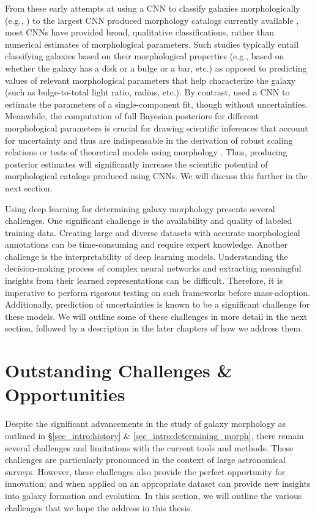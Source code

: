 From these early attempts at using a CNN to classify galaxies morphologically (e.g.,  \citealp{Dieleman2015Rotation-invariantPrediction}) to the largest CNN produced morphology catalogs currently available \citep{Cheng2021GalaxyNetworks, Vega-Ferrero2021PushingSurvey}, most CNNs have provided broad, qualitative classifications, rather than numerical estimates of morphological parameters. Such studies typically entail classifying galaxies based on their morphological properties (e.g., based on whether the galaxy has a disk or a bulge or a bar, etc.) as opposed to predicting values of relevant morphological parameters that help characterize the galaxy (such as bulge-to-total light ratio, radius, etc.). By contrast, \citet{Tuccillo2018DeepFitting} used a CNN to estimate the parameters of a single-component \sersic{} fit, though  without uncertainties. Meanwhile, the computation of full Bayesian posteriors for different morphological parameters is crucial for drawing scientific inferences that account for uncertainty and thus are indispensable in the derivation of robust scaling relations  \citep[e.g.,][]{Bernardi2013TheProfile, vanderWel20143D-HST+CANDELS:3} or tests of theoretical models using morphology \citep[e.g.,][]{Schawinski2014TheGalaxies}. Thus, producing posterior estimates will significantly increase the scientific potential of morphological catalogs produced using CNNs. We will discuss this further in the next section. 

Using deep learning for determining galaxy morphology presents several challenges. One significant challenge is the availability and quality of labeled training data. Creating large and diverse datasets with accurate morphological annotations can be time-consuming and require expert knowledge. Another challenge is the interpretability of deep learning models. Understanding the decision-making process of complex neural networks and extracting meaningful insights from their learned representations can be difficult. Therefore, it is imperative to perform rigorous testing on such frameworks before mass-adoption. Additionally, prediction of uncertainties is known to be a significant challenge for these models. We will outline some of these challenges in more detail in the next section, followed by a description in the later chapters of how we address them.

\section{Outstanding Challenges \& Opportunities} \label{sec_intro:outstanding_challenges}
Despite the significant advancements in the study of galaxy morphology as outlined in \S \ref{sec_intro:history} \& \ref{sec_intro:determining_morph}, there remain several challenges and limitations with the current tools and methods.
These challenges are particularly pronounced in the context of large astronomical surveys. However, these challenges also provide the perfect opportunity for innovation; and when applied on an appropriate dataset can provide new insights into galaxy formation and evolution. In this section, we will outline the various challenges that we hope the address in this thesis. 

